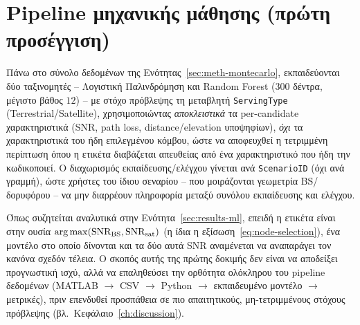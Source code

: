 \section{Pipeline μηχανικής μάθησης (πρώτη προσέγγιση)}
\label{sec:meth-ml}

Πάνω στο σύνολο δεδομένων της Ενότητας~\ref{sec:meth-montecarlo},
εκπαιδεύονται δύο ταξινομητές -- Λογιστική Παλινδρόμηση και Random Forest
($300$ δέντρα, μέγιστο βάθος $12$) -- με στόχο πρόβλεψης τη μεταβλητή
\texttt{ServingType} (Terrestrial/Satellite), χρησιμοποιώντας
\emph{αποκλειστικά} τα per-candidate χαρακτηριστικά (SNR, path loss,
distance/elevation υποψηφίων), \emph{όχι} τα χαρακτηριστικά του ήδη
επιλεγμένου κόμβου, ώστε να αποφευχθεί η τετριμμένη περίπτωση όπου
η ετικέτα διαβάζεται απευθείας από ένα χαρακτηριστικό που ήδη την κωδικοποιεί.
Ο διαχωρισμός εκπαίδευσης/ελέγχου γίνεται ανά \texttt{ScenarioID} (όχι ανά
γραμμή), ώστε χρήστες του ίδιου σεναρίου -- που μοιράζονται γεωμετρία BS/
δορυφόρου -- να μην διαρρέουν πληροφορία μεταξύ συνόλου εκπαίδευσης και
ελέγχου.

Όπως συζητείται αναλυτικά στην Ενότητα~\ref{sec:results-ml}, επειδή η
ετικέτα είναι στην ουσία $\operatorname*{arg\,max}(\text{SNR}_{\text{BS}},
\text{SNR}_{\text{sat}})$ (η ίδια η εξίσωση~\eqref{eq:node-selection}), ένα
μοντέλο στο οποίο δίνονται και τα δύο αυτά SNR αναμένεται να αναπαράγει
τον κανόνα σχεδόν τέλεια. Ο σκοπός αυτής της πρώτης δοκιμής δεν είναι να
αποδείξει προγνωστική ισχύ, αλλά να επαληθεύσει την ορθότητα ολόκληρου του
pipeline δεδομένων (MATLAB $\rightarrow$ CSV $\rightarrow$ Python
$\rightarrow$ εκπαιδευμένο μοντέλο $\rightarrow$ μετρικές), πριν
επενδυθεί προσπάθεια σε πιο απαιτητικούς, μη-τετριμμένους στόχους
πρόβλεψης (βλ.~Κεφάλαιο~\ref{ch:discussion}).
